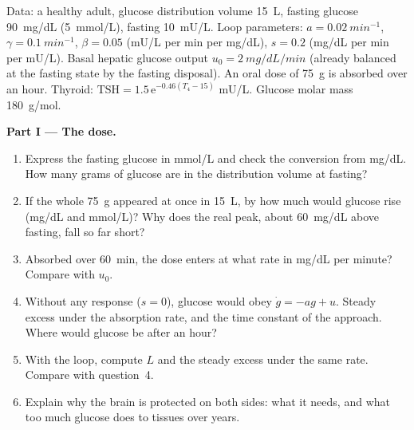 \begin{problem}
\label{pb:b3:endocrinology:1}
Data: a healthy adult, glucose distribution volume \qty{15}{L},
fasting glucose \qty{90}{mg/dL} (\qty{5}{mmol/L}), fasting 
\qty{10}{mU/L}. Loop parameters: $a = \qty{0.02}{min^{-1}}$, $\gamma =
\qty{0.1}{min^{-1}}$, $\beta = 0.05$ (mU/L per min per mg/dL), $s = 0.2$
(mg/dL per min per mU/L). Basal hepatic glucose output $u_{0} =
\qty{2}{mg/dL/min}$ (already balanced at the fasting state by the
fasting disposal). An oral dose of \qty{75}{g} is absorbed over an
hour. Thyroid: $\text{TSH} = 1.5\,\mathrm{e}^{-0.46(T_{4} - 15)}$ mU/L.
Glucose molar mass \qty{180}{g/mol}.

\medskip
\noindent\textbf{Part I --- The dose.}
\begin{enumerate}
  \item Express the fasting glucose in mmol/L and check the conversion
        from mg/dL. How many grams of glucose are in the distribution
        volume at fasting?
  \item If the whole \qty{75}{g} appeared at once in \qty{15}{L}, by how
        much would glucose rise (mg/dL and mmol/L)? Why does the real
        peak, about \qty{60}{mg/dL} above fasting, fall so far short?
  \item Absorbed over \qty{60}{min}, the dose enters at what rate in
        mg/dL per minute? Compare with $u_{0}$.
  \item Without any  response ($s = 0$), glucose would obey $\dot
        g = -a g + u$. Steady excess under the absorption rate, and the
        time constant of the approach. Where would glucose be after an
        hour?
  \item With the loop, compute $L$ and the steady excess under the same
        rate. Compare with question~4.
  \item Explain why the brain is protected on both sides: what it needs,
        and what too much glucose does to tissues over years.
\end{enumerate}


\end{problem}
